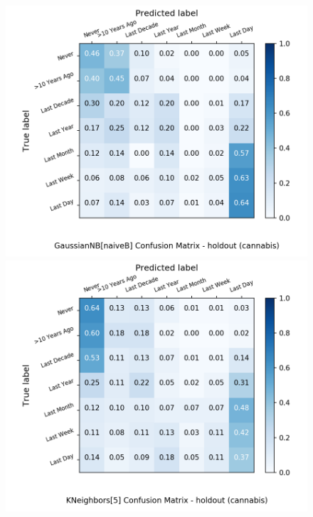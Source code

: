 \begin{figure}[H]
\begin{minipage}[b]{0.32\textwidth}
		\includegraphics[width=1.1\textwidth]{Plots/cannabis_GaussianNB_naiveB_balance_False_holdout.png}
	\end{minipage}
	\begin{minipage}[b]{0.32\textwidth}
		\includegraphics[width=1.1\textwidth]{Plots/cannabis_KNeighbors_5_balance_False_holdout.png}
  \end{minipage}
	\begin{minipage}[b]{0.32\textwidth}

\end{minipage}
\end{figure}
